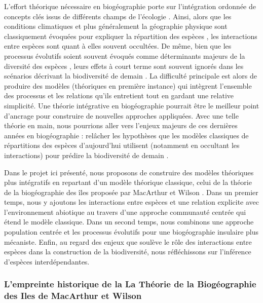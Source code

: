 L'effort théorique nécessaire en biogéographie porte sur l'intégration
ordonnée de concepts clés issus de différents champs de l'écologie
\cite{Thuiller2013}. Ainsi, alors que les conditions climatiques et plus
généralement la géographie physique sont classiquement évoquées pour
expliquer la répartition des espèces \cite{Kearney2004}, les
interactions entre espèces sont quant à elles souvent occultées. De
même, bien que les processus évolutifs soient souvent évoqués comme
déterminants majeurs de la diversité des espèces \cite{Rosindell2011},
leurs effets à court terme sont souvent ignorés \cite{Parmesan2006} dans
les scénarios décrivant la biodiversité de demain \cite{Lavergne2010}.
La difficulté principale est alors de produire des modèles (théoriques
en première instance) qui intègrent l'ensemble des processus et les
relations qu'ils entretient \cite{Thuiller2013} tout en gardant une
relative simplicité. Une théorie intégrative en biogéographie pourrait
être le meilleur point d'ancrage pour construire de nouvelles approches
appliquées. Avec une telle théorie en main, nous pourrions aller vers
l'enjeux majeurs de ces dernières années en biogéographie : relâcher les
hypothèses que les modèles classiques de répartitions des espèces
d'aujourd'hui utilisent (notamment en occultant les interactions) pour
prédire la biodiversité de demain \cite{Guisan2011}.

Dans le projet ici présenté, nous proposons de construire des modèles
théoriques plus intégratifs en repartant d'un modèle théorique
classique, celui de la théorie de la biogéographie des îles proposée par
MacArthur et Wilson \cite{MacArthur1967}. Dans un premier temps, nous y
ajoutons les interactions entre espèces et une relation explicite avec
l'environnement abiotique au travers d'une approche communauté centrée
qui étend le modèle classique. Dans un second temps, nous combinons une
approche population centrée et les processus évolutifs pour une
biogéographie insulaire plus mécaniste. Enfin, au regard des enjeux que
soulève le rôle des interactions entre espèces dans la construction de
la biodiversité, nous réfléchissons sur l'inférence d'espèces
interdépendantes.

\subsubsection*{L'empreinte historique de la La Théorie de la
Biogéographie des Iles de MacArthur et
Wilson}\label{lempreinte-historique-de-la-la-thuxe9orie-de-la-bioguxe9ographie-des-iles-de-macarthur-et-wilson}

